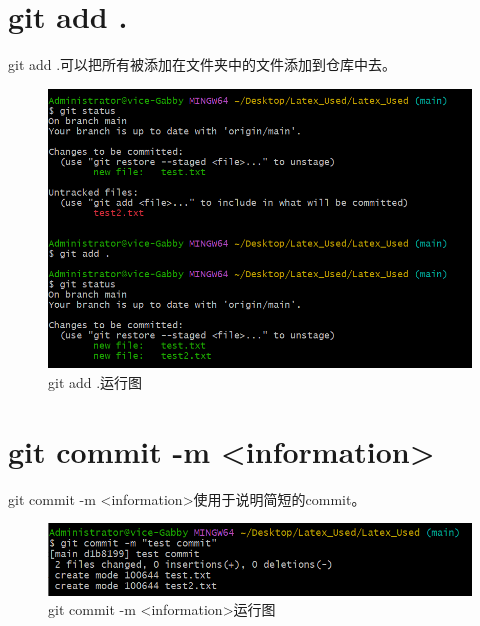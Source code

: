 \documentclass{article}
\begin{document}
\section{git add .}
git add .可以把所有被添加在文件夹中的文件添加到仓库中去。
\begin{figure}[H]
    \centering
    \includegraphics[width=1\linewidth]{git_add.png}
    \caption{git add .运行图}
    \label{fig:addall}
\end{figure}

\section{git commit -m <information>}
git commit -m <information>使用于说明简短的commit。
\begin{figure}[H]
    \centering
    \includegraphics[width=1\linewidth]{git_commit.png}
    \caption{git commit -m <information>运行图}
    \label{fig:commit}
\end{figure}
\end{document}
